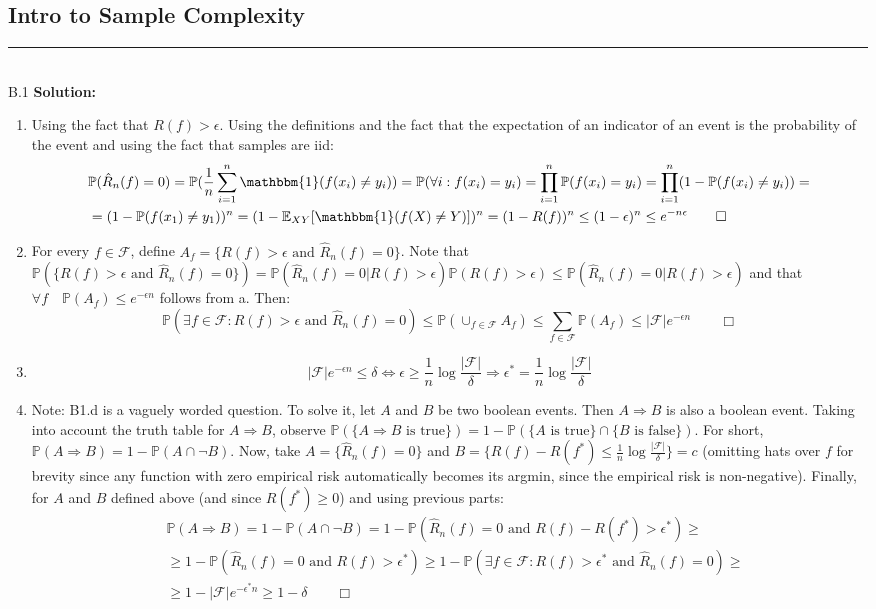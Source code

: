 \documentclass{article}
\newcommand{\1}{\mathbf{1}}
\newcommand{\I}{\mathbbm{1}}
\newcommand{\E}{\mathbb{E}}
\renewcommand{\P}{\mathbb{P}}
\begin{document}
\subsection*{Intro to Sample Complexity}
\noindent\rule{\textwidth}{1pt}
\\
B.1 {\bf Solution:}\\
\begin{enumerate}
    \item Using the fact that $R(f) > \epsilon$. Using the definitions and the fact that the expectation of an indicator of an event is the probability of the event and using the fact that samples are iid:
    \begin{align}
    & \P(\hat{R}_n(f) = 0) = \P(\frac{1}{n}\sum_{i=1}^n \I(f(x_i) \not = y_i)) = \P(\forall i: f(x_i) = y_i) = \prod_{i=1}^n \P(f(x_i)=y_i) =  \prod_{i=1}^n (1-\P(f(x_i)\not = y_i)) =  \\
    &= (1-\P(f(x_1)\not = y_1))^n = (1 - \E_{XY}[\I(f(X) \not = Y)])^n = (1 - R(f))^n \le (1-\epsilon)^n \le e^{-n\epsilon} \qquad \Box
    \end{align}
    \item For every $f \in \mathcal{F}$, define $A_f = \{R(f)>\epsilon \text{ and } \hat{R}_n(f) = 0 \}$. Note that $\P(\{R(f)>\epsilon \text{ and } \hat{R}_n(f) = 0 \}) = \P(\hat{R}_n(f) = 0|R(f)>\epsilon)\P(R(f)>\epsilon) \le \P(\hat{R}_n(f) = 0|R(f)>\epsilon)$ and that $\forall f \quad \P(A_f) \le e^{-\epsilon n}$ follows from a. Then:
    $$
    \P(\exists f \in \mathcal{F}: R(f) > \epsilon \text{ and } \hat{R}_n(f) = 0) \le \P(\cup_{f \in \mathcal{F}} A_f) \le \sum_{f \in \mathcal{F}} \P(A_f) \le |\mathcal{F}|e^{-\epsilon n} \qquad \Box
    $$
    \item $$
    |\mathcal{F}|e^{-\epsilon n} \le \delta \Leftrightarrow \epsilon \ge \frac{1}{n}\log \frac{\mathcal{|F|}}{\delta} \Rightarrow \boxed{\epsilon^* = \frac{1}{n}\log \frac{\mathcal{|F|}}{\delta}}
    $$
    \item Note: B1.d is a vaguely worded question. To solve it, let $A$ and $B$ be two boolean events. Then $A \Rightarrow B$ is also a boolean event. Taking into account the truth table for $A \Rightarrow B$, observe $\P(\{A \Rightarrow B \text{ is true}\}) = 1 - \P(\{A \text{ is true}\}  \cap \{B  \text{ is false}\})$. For short,  $\P(A \Rightarrow B) = 1 - \P(A \cap \neg B)$. Now, take $A = \{\hat{R}_n(f) = 0\}$ and $B = \{R(f) - R(f^*) \le \frac{1}{n}\log \frac{\mathcal{|F|}}{\delta}\} =c $ (omitting hats over $f$ for brevity since any function with zero empirical risk automatically becomes its argmin, since the empirical risk is non-negative). Finally, for $A$ and $B$ defined above (and since $R(f^*) \ge 0$) and using previous parts:
    \begin{align}
        &\P(A \Rightarrow B) = 1 - \P(A \cap \neg B) = 1 - \P(\hat{R}_n(f) = 0 \text{ and } R(f) - R(f^*) > \epsilon^*) \ge \\
        & \ge 1 - \P(\hat{R}_n(f) = 0 \text{ and } R(f) > \epsilon^*) \ge
        1 - \P(\exists f \in \mathcal{F}: R(f) > \epsilon^* \text{ and } \hat{R}_n(f) = 0) \ge \\
        &\ge 1 - |\mathcal{F}|e^{-\epsilon^* n} \ge 1 - \delta \qquad \Box
    \end{align}
    \end{enumerate}   
\end{document}
